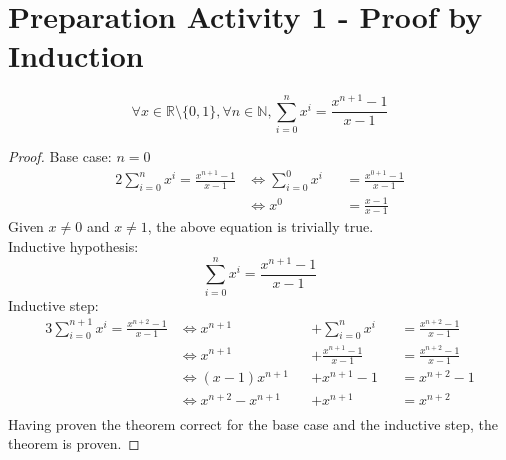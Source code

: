 \documentclass[docid=PA01]{tcom_PA}
\begin{document}
\setcounter{section}{0}
\section{Preparation Activity 1 - Proof by Induction}
\begin{theorem}
	\begin{equation*}
		\forall x \in \mathbb{R}\setminus \{0,1\},\forall n \in \mathbb{N}, \sum_{i=0}^{n}{x^i} = \frac{x^{n+1}-1}{x-1}
	\end{equation*}
\end{theorem}
\begin{proof}
Base case: $n=0$
\begin{alignat*}{2}
	\sum_{i=0}^{n}{x^i} = \frac{x^{n+1}-1}{x-1}
	&\iff \sum_{i=0}^{0}{x^i} &&= \frac{x^{0+1}-1}{x-1}\\
	&\iff x^0                 &&= \frac{x-1}{x-1}
\end{alignat*}
Given $x \neq 0$ and $x \neq 1$, the above equation is trivially true.\\
Inductive hypothesis:
\begin{equation*}
\sum_{i=0}^{n}{x^i} = \frac{x^{n+1}-1}{x-1}
\end{equation*}
Inductive step:
\begin{alignat*}{3}
	\sum_{i=0}^{n+1}{x^i} = \frac{x^{n+2}-1}{x-1}
	&\iff x^{n+1}         &&+\sum_{i=0}^{n}{x^i}   &&= \frac{x^{n+2}-1}{x-1}\\
	&\iff x^{n+1}         &&+\frac{x^{n+1}-1}{x-1} &&= \frac{x^{n+2}-1}{x-1}\\
	&\iff (x-1)x^{n+1}    &&+x^{n+1}-1             &&= x^{n+2}-1\\
	&\iff x^{n+2}-x^{n+1} &&+x^{n+1}               &&= x^{n+2}\\
\end{alignat*}
Having proven the theorem correct for the base case and the inductive step, the theorem is proven.
\end{proof}
\end{document}
